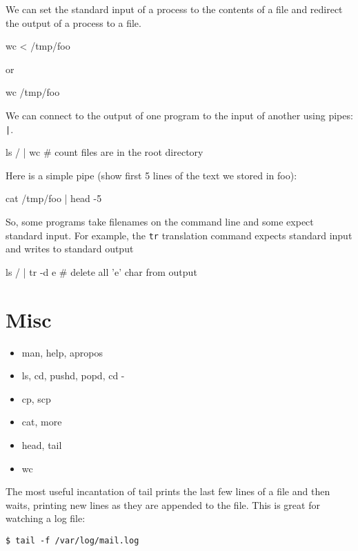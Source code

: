 \begin{fullwidth}
We can set the standard input of a process to the contents of a file and redirect the output of a process to a file.

{\small
\bash[script,stdout,prefix=$]
wc < /tmp/foo
\END
}

or

{\small
\bash[script,stdout,prefix=$]
wc /tmp/foo
\END
}

We can connect to the output of one program to the input of another using pipes: {\tt |}. 

{\small
\bash[script,stdout,prefix=$]
ls / | wc # count files are in the root directory
\END
}

Here is a simple pipe (show first 5 lines of the text we stored in foo):

{\small
\bash[script,stdout,prefix=$]
cat /tmp/foo | head -5 
\END
}

So, some programs take filenames on the command line and some expect standard input. For example, the {\tt tr} translation command expects standard input and writes to standard output

{\small
\bash[script,stdout,prefix=$]
ls / | tr -d e # delete all 'e' char from output
\END
}

\section{Misc}

\begin{itemize}
\item man, help, apropos

\item ls, cd, pushd, popd, cd -

\item cp, scp

\item cat, more

\item head, tail

\item wc

\end{itemize}

The most useful incantation of tail prints the last few lines of a file and then waits, printing new lines as they are appended to the file. This is great for watching a log file:

\begin{lstlisting}[style=BashInputStyle]
$ tail -f /var/log/mail.log
\end{lstlisting}



\end{fullwidth}
